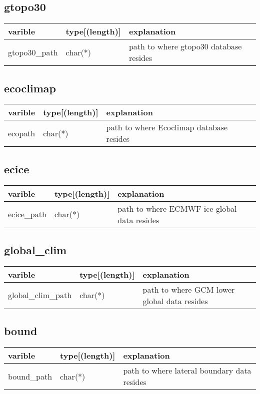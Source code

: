 \documentclass{article}
\begin{document}
\subsection{gtopo30}
\begin{tabular}{|l|l|l|}
  \hline
  varible & type[(length)] & explanation \\
  \hline
  \hline
  gtopo30\_path & char(*) & path to where gtopo30 database resides \\
 \hline
\end{tabular}

\subsection{ecoclimap}
\begin{tabular}{|l|l|l|}
  \hline
  varible & type[(length)] & explanation \\
  \hline
  \hline
  ecopath & char(*) & path to where Ecoclimap database resides \\
 \hline
\end{tabular}

\subsection{ecice}
\begin{tabular}{|l|l|l|}
  \hline
  varible & type[(length)] & explanation \\
  \hline
  \hline
  ecice\_path & char(*) & path to where ECMWF ice global data resides \\
 \hline
\end{tabular}

\subsection{global\_clim}
\begin{tabular}{|l|l|l|}
  \hline
  varible & type[(length)] & explanation \\
  \hline
  \hline
  global\_clim\_path & char(*) & path to where GCM lower global data resides \\
 \hline
\end{tabular}

\subsection{bound}
\begin{tabular}{|l|l|l|}
  \hline
  varible & type[(length)] & explanation \\
  \hline
  \hline
  bound\_path & char(*) & path to where lateral boundary data resides \\
 \hline
\end{tabular}
\end{document}
